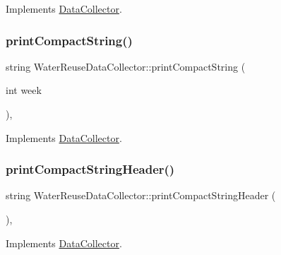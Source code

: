 Implements \mbox{\hyperlink{classDataCollector_a01486bf58acbe37b203f97b3b9a79c40}{Data\+Collector}}.

\mbox{\label{classWaterReuseDataCollector_a6b37aa4b2031cf0a1a1326da2bd64420}} 
\subsubsection{\texorpdfstring{print\+Compact\+String()}{printCompactString()}}
{\footnotesize\ttfamily string Water\+Reuse\+Data\+Collector\+::print\+Compact\+String (\begin{DoxyParamCaption}\item[{int}]{week }\end{DoxyParamCaption})\hspace{0.3cm}{\ttfamily [override]}, {\ttfamily [virtual]}}



Implements \mbox{\hyperlink{classDataCollector_a2eac264fa5612aed5a830b12de4f4ae3}{Data\+Collector}}.

\mbox{\label{classWaterReuseDataCollector_afef08bead3f2c60c2b9c975864456ef1}} 
\subsubsection{\texorpdfstring{print\+Compact\+String\+Header()}{printCompactStringHeader()}}
{\footnotesize\ttfamily string Water\+Reuse\+Data\+Collector\+::print\+Compact\+String\+Header (\begin{DoxyParamCaption}{ }\end{DoxyParamCaption})\hspace{0.3cm}{\ttfamily [override]}, {\ttfamily [virtual]}}



Implements \mbox{\hyperlink{classDataCollector_a98dcb4ec871d9c7fbf7545c64e5ccc67}{Data\+Collector}}.

